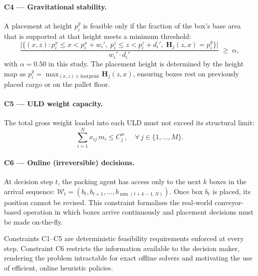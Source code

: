 \paragraph{C4 — Gravitational stability.}
A placement at height $p_i^y$ is feasible only if the fraction of the
box's base area that is supported at that height meets a minimum threshold:
\begin{equation}
\label{eq:stability}
\frac{\bigl|\{(x,z) : p_i^x \leq x < p_i^x + w_i',\;
                      p_i^z \leq z < p_i^z + d_i',\;
                      \mathbf{H}_j(z,x) = p_i^y\}\bigr|}
     {w_i' \cdot d_i'}
\;\geq\; \alpha,
\end{equation}
with $\alpha = 0.50$ in this study.
The placement height is determined by the height map as
$p_i^y = \max_{(x,z) \in \text{footprint}}\mathbf{H}_j(z,x)$,
ensuring boxes rest on previously placed cargo or on the pallet floor.

\paragraph{C5 — ULD weight capacity.}
The total gross weight loaded into each ULD must not exceed its structural
limit:
\begin{equation}
\label{eq:weight}
\sum_{i=1}^{N} x_{ij}\, m_i \leq C_j^w, \quad \forall\, j \in \{1,\ldots,M\}.
\end{equation}

\paragraph{C6 — Online (irreversible) decisions.}
At decision step $t$, the packing agent has access only to the next $k$
boxes in the arrival sequence:
$\mathcal{W}_t = (b_t, b_{t+1}, \ldots, b_{\min(t+k-1, N)})$.
Once box $b_t$ is placed, its position cannot be revised.
This constraint formalises the real-world conveyor-based operation in which
boxes arrive continuously and placement decisions must be made on-the-fly.

\medskip
\noindent
Constraints C1--C5 are deterministic feasibility requirements enforced at
every step.
Constraint C6 restricts the information available to the decision maker,
rendering the problem intractable for exact offline solvers and motivating
the use of efficient, online heuristic policies.



